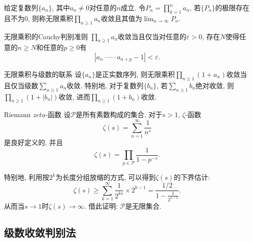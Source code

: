 给定复数列$\{ a_n \}$, 其中$a_n \neq 0$对任意的$n$成立. 令$P_n = \prod_{k=1}^{n} a_n$, 若$\{ P_n \}$的极限存在且不为$0$, 则称无限乘积$\prod_{n \geq 1}a_n$收敛且其值为$\lim_{n \to \infty} P_n$. 

\begin{exercise}{无限乘积的Cauchy判别准则}
	$\prod_{n \geq 1}a_n$收敛当且仅当对任意的$\varepsilon >0$, 存在$N$使得任意的$n \geq N$和任意的$p \geq 0$有$$|a_n \cdot \cdots \cdot a_{n+p}-1|<\varepsilon .$$
\end{exercise}
\begin{solution}
	
\end{solution}

\begin{exercise}{无限乘积与级数的联系}
	设$\{ a_n \}$是正实数序列, 则无限乘积$\prod_{n \geq 1} (1+a_n)$收敛当且仅当级数$\sum_{n\geq 1}a_n$收敛. 特别地, 对于复数列$\{ b_n \}$, 若$\sum_{n\geq 1}b_n$绝对收敛, 则$\prod_{n \geq 1} (1+|b_n|)$收敛, 进而$\prod_{n \geq 1} (1+b_n)$收敛. 
\end{exercise}
\begin{solution}
	
\end{solution}

\begin{exercise}{Riemann $zeta$-函数}
	设$\mathcal{P}$是所有素数构成的集合. 对于$s>1$, $\zeta$-函数$$\zeta (s) = \sum_{n=1}^{\infty} \frac{1}{n^s}$$
是良好定义的, 并且$$\zeta (s) = \prod_{p \in \mathcal{P}} \frac{1}{1-p^{-s}}. $$
	
	特别地, 利用按$2^k$为长度分组放缩的方式, 可以得到$\zeta (s)$的下界估计: $$\zeta (s) \geq \sum_{k=1}^{\infty} \frac{1}{2^{ks}} \times 2^{k-1} = \frac{1/2}{1-\frac{1}{2^{s-1}}}.$$
从而当$s \to 1$时$\zeta (s) \to \infty$. 借此证明: $\mathcal{P}$是无限集合. 
\end{exercise}
\begin{solution}
	
\end{solution}

\clearpage
\subsection{级数收敛判别法}

